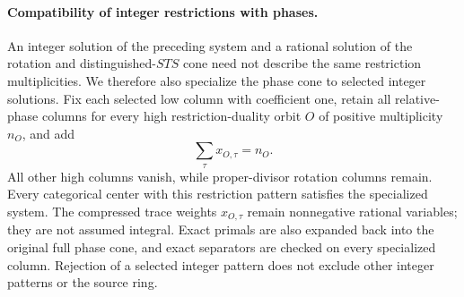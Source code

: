 \paragraph{Compatibility of integer restrictions with phases.}
An integer solution of the preceding system and a rational solution of the
rotation and distinguished-$STS$ cone need not describe the same restriction
multiplicities. We therefore also specialize the phase cone to selected
integer solutions. Fix each selected low column with coefficient one, retain
all relative-phase columns for every high restriction-duality orbit $O$ of
positive multiplicity $n_O$, and add
\[
 \sum_{\tau}x_{O,\tau}=n_O.
\]
All other high columns vanish, while proper-divisor rotation columns remain.
Every categorical center with this restriction pattern satisfies the
specialized system. The compressed trace weights $x_{O,\tau}$ remain
nonnegative rational variables; they are not assumed integral. Exact primals
are also expanded back into the original full phase cone, and exact
separators are checked on every specialized column. Rejection of a selected
integer pattern does not exclude other integer patterns or the source ring.
